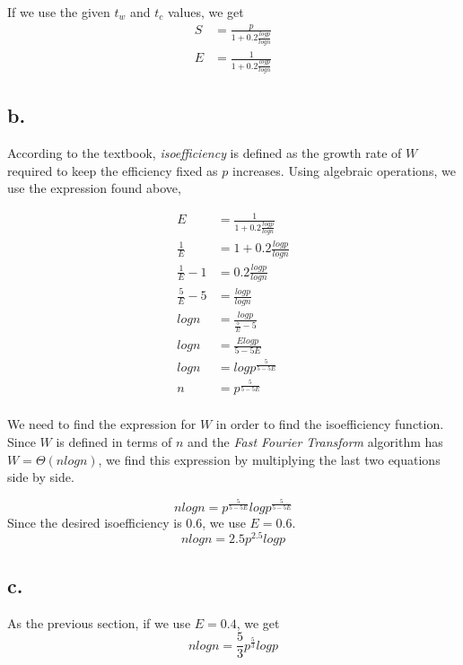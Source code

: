 \documentclass[11pt]{article}
\begin{document}
If we use the given $t_w$ and $t_c$ values, we get
\begin{align*}
    S&=\frac{p}{1+0.2\frac{logp}{logn}}\\
    E&=\frac{1}{1+0.2\frac{logp}{logn}}
\end{align*}
\subsection*{b.}
According to the textbook, \textit{isoefficiency} is defined as the growth rate of $W$
    required to keep the efficiency fixed as $p$ increases. Using algebraic operations,
    we use the expression found above,
    
    \begin{align*}
        E &= \frac{1}{1+0.2\frac{logp}{logn}} \\
        \frac{1}{E} &= 1+0.2\frac{logp}{logn} \\
        \frac{1}{E} -1 &= 0.2\frac{logp}{logn} \\
        \frac{5}{E} -5 &= \frac{logp}{logn} \\
        logn&= \frac{logp}{\frac{5}{E} -5} \\
        logn&= \frac{Elogp}{5-5E} \\
        logn&= logp^{\frac{5}{5-5E}} \\
        n&= p^{\frac{5}{5-5E}} \\
    \end{align*}
    
We need to find the expression for $W$ in order to find the isoefficiency function.
    Since $W$ is defined in terms of $n$ and the \textit{Fast Fourier Transform}
    algorithm has $W=\Theta(nlogn)$, we find this expression by multiplying the last
    two equations side by side.
    
\[
    nlogn = p^{\frac{5}{5-5E}}logp^{\frac{5}{5-5E}}
\]
Since the desired isoefficiency is $0.6$, we use $E=0.6$.
\[
    nlogn = 2.5p^{2.5}logp
\]
\subsection*{c.}
As the previous section, if we use $E=0.4$, we get
\[
    nlogn = \frac{5}{3}p^{\frac{5}{3}}logp
\]
\end{document}
